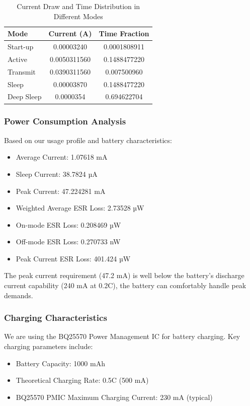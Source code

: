 \documentclass[a4paper,11pt]{article}%
\begin{document}
\begin{table}[h]
\centering
\begin{tabular}{|l|c|c|}
\hline
\textbf{Mode} & \textbf{Current (A)} & \textbf{Time Fraction} \\
\hline
Start-up & 0.00003240 & 0.0001808911 \\
Active & 0.0050311560 & 0.1488477220 \\
Transmit & 0.0390311560 & 0.007500960 \\
Sleep & 0.00003870 & 0.1488477220 \\
Deep Sleep & 0.0000354 & 0.694622704 \\
\hline
\end{tabular}
\caption{Current Draw and Time Distribution in Different Modes}
\label{tab:current_distribution}
\end{table}

\subsubsection{Power Consumption Analysis}

Based on our usage profile and battery characteristics:

\begin{itemize}
    \item Average Current: 1.07618 mA
    \item Sleep Current: 38.7824 µA
    \item Peak Current: 47.224281 mA
    \item Weighted Average ESR Loss: 2.73528 µW
    \item On-mode ESR Loss: 0.208469 µW
    \item Off-mode ESR Loss: 0.270733 nW
    \item Peak Current ESR Loss: 401.424 µW
\end{itemize}

The peak current requirement (47.2 mA) is well below the battery's discharge current capability (240 mA at 0.2C), the battery can comfortably handle peak demands.

\subsubsection{Charging Characteristics}

We are using the BQ25570 Power Management IC for battery charging. Key charging parameters include:

\begin{itemize}
    \item Battery Capacity: 1000 mAh
    \item Theoretical Charging Rate: 0.5C (500 mA)
    \item BQ25570 PMIC Maximum Charging Current: 230 mA (typical)
\end{itemize}
\end{document}
